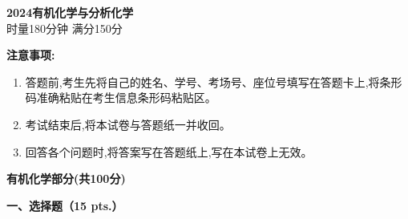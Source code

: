 \begin{center}
    {\LARGE \textbf{2024有机化学与分析化学}} \\[2ex]
    {\large 时量180分钟 \quad 满分150分}
\end{center}

\vspace{0.5cm}
\noindent\textbf{注意事项:}
\begin{enumerate}[label=\arabic*., parsep=0pt, itemsep=0pt]
    \item 答题前,考生先将自己的姓名、学号、考场号、座位号填写在答题卡上,将条形码准确粘贴在考生信息条形码粘贴区。
    \item 考试结束后,将本试卷与答题纸一并收回。
    \item 回答各个问题时,将答案写在答题纸上,写在本试卷上无效。
\end{enumerate}

\vspace{1cm}
\begin{center}
    {\Large \textbf{有机化学部分(共100分)}}
\end{center}

\vspace{0.5cm}
\noindent\textbf{一、选择题（15 pts.）}

